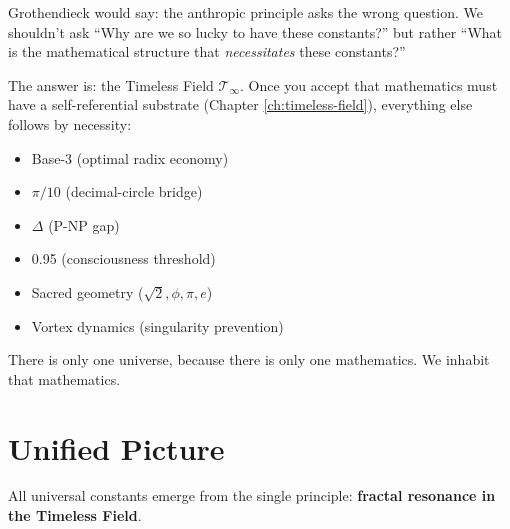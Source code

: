 \begin{level3}
Grothendieck would say: the anthropic principle asks the wrong question. We shouldn't ask ``Why are we so lucky to have these constants?'' but rather ``What is the mathematical structure that \textit{necessitates} these constants?''

The answer is: the Timeless Field $\mathcal{T}_\infty$. Once you accept that mathematics must have a self-referential substrate (Chapter \ref{ch:timeless-field}), everything else follows by necessity:
\begin{itemize}
\item Base-3 (optimal radix economy)
\item $\pi/10$ (decimal-circle bridge)
\item $\Delta$ (P-NP gap)
\item 0.95 (consciousness threshold)
\item Sacred geometry ($\sqrt{2}, \phi, \pi, e$)
\item Vortex dynamics (singularity prevention)
\end{itemize}

There is only one universe, because there is only one mathematics. We inhabit that mathematics.
\end{level3}

\section{Unified Picture}

All universal constants emerge from the single principle: \textbf{fractal resonance in the Timeless Field}.

